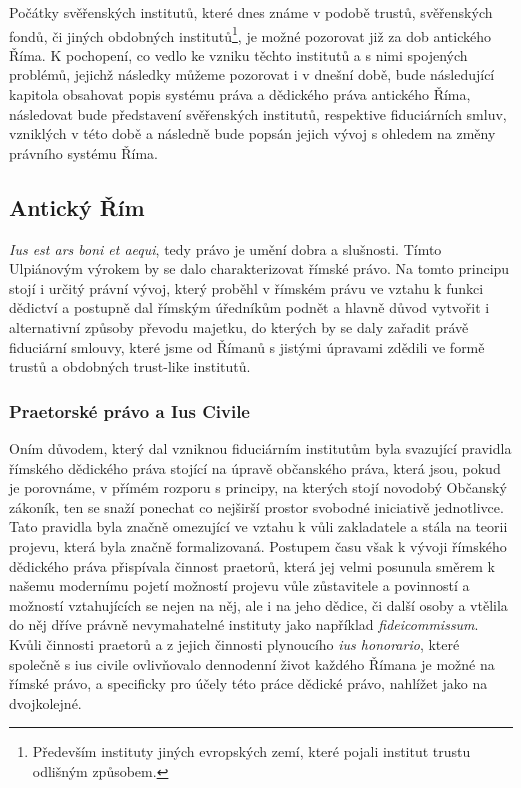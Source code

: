 \documentclass{article}
\begin{document}
Počátky svěřenských institutů, které dnes známe v podobě trustů, svěřenských fondů, či jiných obdobných institutů\footnote{Především instituty jiných evropských zemí, které pojali institut trustu odlišným způsobem.}, je možné pozorovat již za dob antického Říma. K pochopení, co vedlo ke vzniku těchto institutů a s nimi spojených problémů, jejichž následky můžeme pozorovat i v dnešní době, bude následující kapitola obsahovat popis systému práva a dědického práva antického Říma, následovat bude představení svěřenských institutů, respektive fiduciárních s\-mluv, vzniklých v této době a následně bude popsán jejich vývoj s ohledem na změny právního systému Říma.

\subsection{Antický Řím}

\textit{Ius est ars boni et aequi}, tedy právo je umění dobra a slušnosti. Tímto Ulpiá\-novým výrokem by se dalo charakterizovat římské právo. Na tomto principu stojí i určitý právní vývoj, který proběhl v římském právu ve vztahu k funkci dědictví a postupně dal římským úředníkům podnět a hlavně důvod vytvořit i alternativní způsoby převodu majetku, do kterých by se daly zařadit právě fiduciární smlouvy, které jsme od Římanů s jistými úpravami zdědili ve formě trustů a obdobných trust-like institutů.%

\subsubsection{Praetorské právo a Ius Civile}

Oním důvodem, který dal vzniknou fiduciárním institutům byla svazující pravid\-la římského dědického práva stojící na úpravě občanského práva, která jsou, pokud je porovnáme, v přímém rozporu s principy, na kterých stojí novodobý Občanský zákoník, ten se snaží ponechat co nejširší prostor svobodné iniciativě jednotlivce. Tato pravidla byla značně omezující ve vztahu k vůli zakladatele a stála na teorii projevu, která byla značně formalizovaná. Postupem času však k vývoji římského dědického práva přispívala činnost praetorů, která jej velmi posunula směrem k našemu modernímu pojetí možností projevu vůle zůstavitele a povinností a možností vztahujících se nejen na něj, ale i na jeho dědice, či další osoby a vtělila do něj dříve právně nevymahatelné instituty jako například \textit{fideicommissum}. Kvůli činnosti praetorů a z jejich činnosti plynoucího \textit{ius honorario}, které společně s {ius civile} ovlivňovalo dennodenní život každého Římana je možné na římské právo, a specificky pro účely této práce dědické právo, nahlížet jako na dvojkolejné.\\
\end{document}
